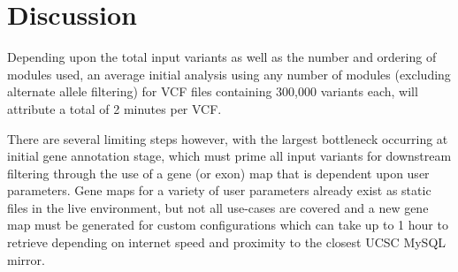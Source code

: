 \documentclass[twocolumn]{bmcart}%
\begin{document}





\section*{Discussion}

Depending upon the total input variants as well as the number and ordering of modules used, an average initial analysis using any number of modules (excluding alternate allele filtering) for VCF files containing 300,000 variants each, will attribute a total of 2 minutes per VCF.

There are several limiting steps however, with the largest bottleneck occurring at initial gene annotation stage, which must prime all input variants for downstream filtering through the use of a gene (or exon) map that is dependent upon user parameters. Gene maps for a variety of user parameters already exist as static files in the live environment, but not all use-cases are covered and a new gene map must be generated for custom configurations which can take up to 1 hour to retrieve depending on internet speed and proximity to the closest UCSC MySQL mirror.
\end{document}
